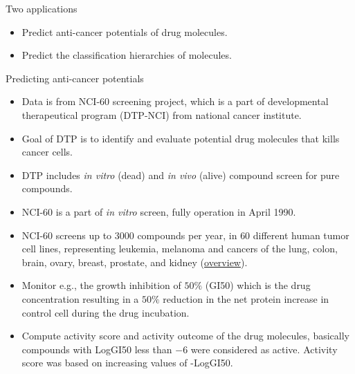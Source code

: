 \documentclass[first=dgreen,second=purple,logo=yellowexc]{aaltoslides}
\begin{document}
{\begin{frame}{Two applications}
	\begin{itemize}
		\item Predict anti-cancer potentials of drug molecules.
		\item Predict the classification hierarchies of molecules.
	\end{itemize}
\end{frame}


\begin{frame}{Predicting anti-cancer potentials}
	\begin{itemize}
		\item Data is from NCI-60 screening project, which is a part of developmental therapeutical program (DTP-NCI) from national cancer institute.
		\item Goal of DTP is to identify and evaluate potential drug molecules that kills cancer cells.
		\item DTP includes \textit{in vitro} (dead) and \textit{in vivo} (alive) compound screen for pure compounds.
		\item NCI-60 is a part of \textit{in vitro} screen, fully operation in April 1990.
		\item NCI-60 screens up to $3000$ compounds per year, in $60$ different human tumor cell lines, representing leukemia, melanoma and cancers of the lung, colon, brain, ovary, breast, prostate, and kidney (\href{http://discover.nci.nih.gov/cellminer/celllineMetadata.do}{overview}). 
		\item Monitor e.g., the growth inhibition of $50\%$ (GI50)  which is the drug concentration resulting in a $50\%$ reduction in the net protein increase in control cell during the drug incubation.
		\item Compute activity score and activity outcome of the drug molecules, basically compounds with LogGI50 less than $-6$ were considered as active. Activity score was based on increasing values of -LogGI50.
	\end{itemize}
\end{frame}

}
\end{document}
